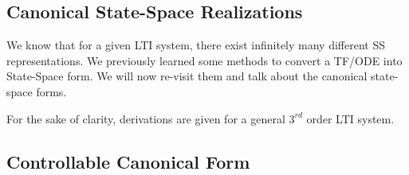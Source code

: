 \documentclass[twoside]{article}
\begin{document}
\subsection{Canonical State-Space Realizations}

We know  that for a given LTI system, there exist infinitely many 
different SS representations. We previously learned some methods 
to convert  a TF/ODE into State-Space form. We will now re-visit
them and talk about the canonical state-space forms.

For the sake of clarity, derivations are given for a general $3^{rd}$ order LTI system.

\subsection{Controllable Canonical Form}
\end{document}
